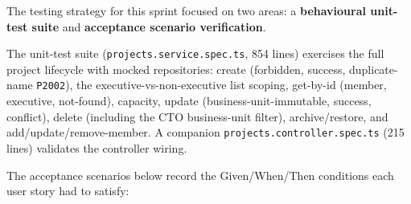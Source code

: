 The testing strategy for this sprint focused on two areas: a \textbf{behavioural unit-test suite}
and \textbf{acceptance scenario verification}.

The unit-test suite (\texttt{projects.service.spec.ts}, 854 lines) exercises the full project
lifecycle with mocked repositories: create (forbidden, success, duplicate-name \texttt{P2002}),
the executive-vs-non-executive list scoping, get-by-id (member, executive, not-found), capacity,
update (business-unit-immutable, success, conflict), delete (including the CTO business-unit
filter), archive/restore, and add/update/remove-member. A companion
\texttt{projects.controller.spec.ts} (215 lines) validates the controller wiring.

The acceptance scenarios below record the Given/When/Then conditions each user story had to
satisfy:

